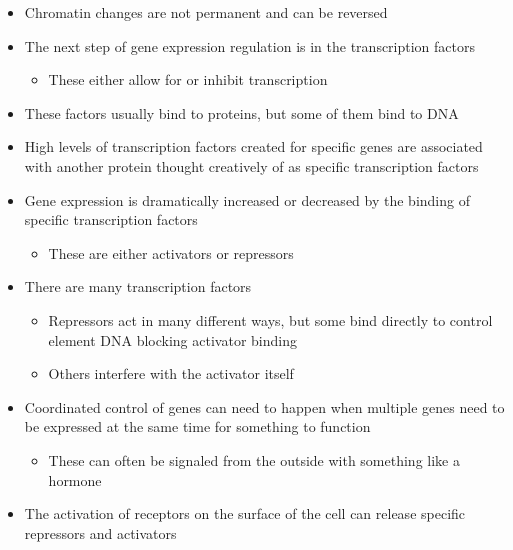 \documentclass[letterpaper]{article}
\begin{document}
\begin{itemize}
\item Chromatin changes are not permanent and can be reversed
\item The next step of gene expression regulation is in the transcription
factors

\begin{itemize}
\item These either allow for or inhibit transcription
\end{itemize}

\item These factors usually bind to proteins, but some of them bind to DNA
\item High levels of transcription factors created for specific genes are
associated with another protein thought creatively of as specific
transcription factors
\item Gene expression is dramatically increased or decreased by the binding
of specific transcription factors

\begin{itemize}
\item These are either activators or repressors
\end{itemize}

\item There are many transcription factors

\begin{itemize}
\item Repressors act in many different ways, but some bind directly to
control element DNA blocking activator binding
\item Others interfere with the activator itself
\end{itemize}

\item Coordinated control of genes can need to happen when multiple genes
need to be expressed at the same time for something to function

\begin{itemize}
\item These can often be signaled from the outside with something like a
hormone
\end{itemize}

\item The activation of receptors on the surface of the cell can release
specific repressors and activators
\end{itemize}
\end{document}
